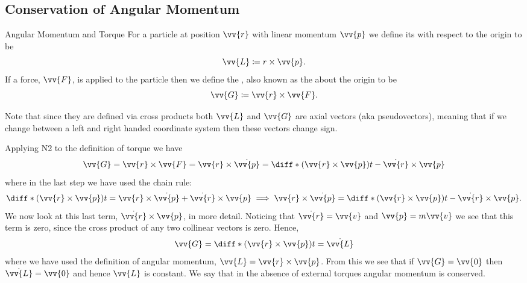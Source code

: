 \documentclass[fleqn]{NotesClass}
\begin{document}
    \subsection{Conservation of Angular Momentum}
    \begin{dfn}{Angular Momentum and Torque}{}
        For a particle at position \(\vv{r}\) with linear momentum \(\vv{p}\) we define its  with respect to the origin to be
        \begin{equation}
            \vv{L} \coloneqq r\times \vv{p}.
        \end{equation}
        If a force, \(\vv{F}\), is applied to the particle then we define the , also known as the  about the origin to be
        \begin{equation}
            \vv{G} \coloneqq \vv{r} \times \vv{F}.
        \end{equation}
    \end{dfn}
    Note that since they are defined via cross products both \(\vv{L}\) and \(\vv{G}\) are axial vectors (aka pseudovectors), meaning that if we change between a left and right handed coordinate system then these vectors change sign.
    
    Applying N2 to the definition of torque we have
    \begin{equation}
        \vv{G} = \vv{r}\times\vv{F} = \vv{r}\times\dot{\vv{p}} = \diff*{(\vv{r}\times\vv{p})}{t} - \dot{\vv{r}}\times\vv{p}
    \end{equation}
    where in the last step we have used the chain rule:
    \begin{equation}
        \diff*{(\vv{r}\times\vv{p})}{t} = \vv{r}\times\dot{\vv{p}} + \dot{\vv{r}}\times\vv{p} \implies \vv{r}\times\dot{\vv{p}} = \diff*{(\vv{r}\times\vv{p})}{t} - \dot{\vv{r}}\times\vv{p}.
    \end{equation}
    We now look at this last term, \(\dot{\vv{r}}\times\vv{p}\), in more detail.
    Noticing that \(\dot{\vv{r}} =\vv{v}\) and \(\vv{p} = m\vv{v}\) we see that this term is zero, since the cross product of any two collinear vectors is zero.
    Hence,
    \begin{equation}
        \vv{G} = \diff*{(\vv{r}\times\vv{p})}{t} = \dot{\vv{L}}
    \end{equation}
    where we have used the definition of angular momentum, \(\vv{L} = \vv{r}\times\vv{p}\).
    From this we see that if \(\vv{G} = \vv{0}\) then \(\dot{\vv{L}} = \vv{0}\) and hence \(\vv{L}\) is constant.
    We say that in the absence of external torques angular momentum is conserved.
    
\end{document}
